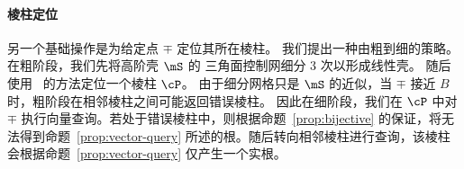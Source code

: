 \paragraph{棱柱定位}
另一个基础操作是为给定点 $\mp$ 定位其所在棱柱。
我们提出一种由粗到细的策略。
在粗阶段，我们先将高阶壳 $\mS$ 的 \Bezier 三角面控制网细分 3 次以形成线性壳。
随后使用~\cite{Jiang2020BijectivePI} 的方法定位一个棱柱 $\cP$。
%
由于细分网格只是 $\mS$ 的近似，当 $\mp$ 接近 $B$ 时，粗阶段在相邻棱柱之间可能返回错误棱柱。
因此在细阶段，我们在 $\cP$ 中对 $\mp$ 执行向量查询。若处于错误棱柱中，则根据命题~\ref{prop:bijective} 的保证，将无法得到命题~\ref{prop:vector-query} 所述的根。随后转向相邻棱柱进行查询，该棱柱会根据命题~\ref{prop:vector-query} 仅产生一个实根。

%
%
%
%

